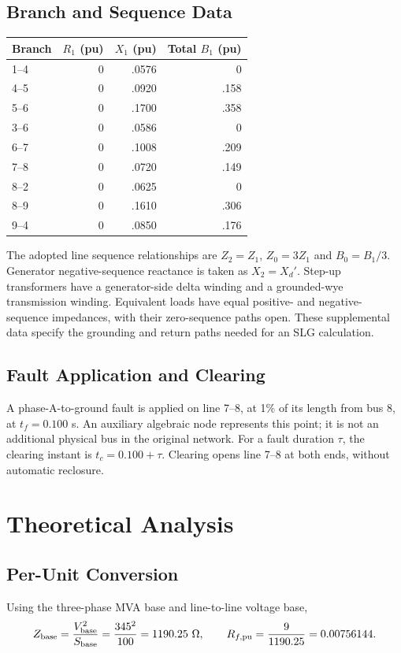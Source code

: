 \documentclass[11pt,a4paper]{article}
\begin{document}
\subsection{Branch and Sequence Data}
\begin{center}\begin{tabular}{lrrr}\toprule Branch&$R_1$ (pu)&$X_1$ (pu)&Total $B_1$ (pu)\\\midrule
1--4&0&.0576&0\\4--5&0&.0920&.158\\5--6&0&.1700&.358\\3--6&0&.0586&0\\6--7&0&.1008&.209\\7--8&0&.0720&.149\\8--2&0&.0625&0\\8--9&0&.1610&.306\\9--4&0&.0850&.176\\\bottomrule\end{tabular}\end{center}
The adopted line sequence relationships are $Z_2=Z_1$, $Z_0=3Z_1$ and $B_0=B_1/3$. Generator negative-sequence reactance is taken as $X_2=X_d'$. Step-up transformers have a generator-side delta winding and a grounded-wye transmission winding. Equivalent loads have equal positive- and negative-sequence impedances, with their zero-sequence paths open. These supplemental data specify the grounding and return paths needed for an SLG calculation.
\subsection{Fault Application and Clearing}
A phase-A-to-ground fault is applied on line 7--8, at 1\% of its length from bus 8, at $t_f=0.100$ s. An auxiliary algebraic node represents this point; it is not an additional physical bus in the original network. For a fault duration $\tau$, the clearing instant is $t_c=0.100+\tau$. Clearing opens line 7--8 at both ends, without automatic reclosure.
\section{Theoretical Analysis}
\subsection{Per-Unit Conversion}
Using the three-phase MVA base and line-to-line voltage base,
\[Z_{\rm base}=\frac{V_{\rm base}^2}{S_{\rm base}}=\frac{345^2}{100}=1190.25\ \Omega,
\qquad R_{f,\rm pu}=\frac{9}{1190.25}=0.00756144.\]
\end{document}
